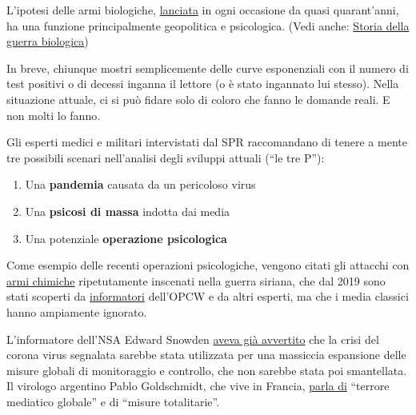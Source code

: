 L'ipotesi delle armi biologiche,
\href{https://www.wilsoncenter.org/blog-post/operation-denver-kgb-and-stasi-disinformation-regarding-aids}{lanciata}
in ogni occasione da quasi quarant'anni, ha una funzione principalmente
geopolitica e psicologica. (Vedi anche:
\href{https://www.emedicinehealth.com/biological_warfare/article_em.htm}{Storia
della guerra biologica})

In breve, chiunque mostri semplicemente delle curve esponenziali con il
numero di test positivi o di decessi inganna il lettore (o è stato
ingannato lui stesso). Nella situazione attuale, ci si può fidare solo
di coloro che fanno le domande reali. E non molti lo fanno.

Gli esperti medici e militari intervistati dal SPR raccomandano di
tenere a mente tre possibili scenari nell'analisi degli sviluppi attuali
(``le tre P''):

\begin{enumerate}
\def\labelenumi{\arabic{enumi}.}
\tightlist
\item
  Una \textbf{pandemia} causata da un pericoloso virus
\item
  Una \textbf{psicosi di massa} indotta dai media
\item
  Una potenziale \textbf{operazione psicologica}
\end{enumerate}

Come esempio delle recenti operazioni psicologiche, vengono citati gli
attacchi con
\href{https://www.globalresearch.ca/the-bbc-saving-syrias-children-documentary-staged-events-fake-video-footage/5470158}{armi
chimiche} ripetutamente inscenati nella guerra siriana, che dal 2019
sono stati scoperti da
\href{https://thegrayzone.com/2020/01/22/ian-henderson-opcw-whistleblower-un-no-chemical-attack-douma-syria/}{informatori}
dell'OPCW e da altri esperti, ma che i media classici hanno ampiamente
ignorato.

L'informatore dell'NSA Edward Snowden
\href{https://www.futurezone.de/digital-life/article228779795/Gefaehrliche-weltweite-Entwicklung-Edward-Snowden-warnt-vor-Ueberwachung.html}{aveva
già avvertito} che la crisi del corona virus segnalata sarebbe stata
utilizzata per una massiccia espansione delle misure globali di
monitoraggio e controllo, che non sarebbe stata poi smantellata. Il
virologo argentino Pablo Goldschmidt, che vive in Francia,
\href{https://www.infobae.com/coronavirus/2020/03/28/para-un-prestigioso-cientifico-argentino-el-coronavirus-no-merece-que-el-planeta-este-en-un-estado-de-parate-total/}{parla
di} ``terrore mediatico globale'' e di ``misure totalitarie''.

